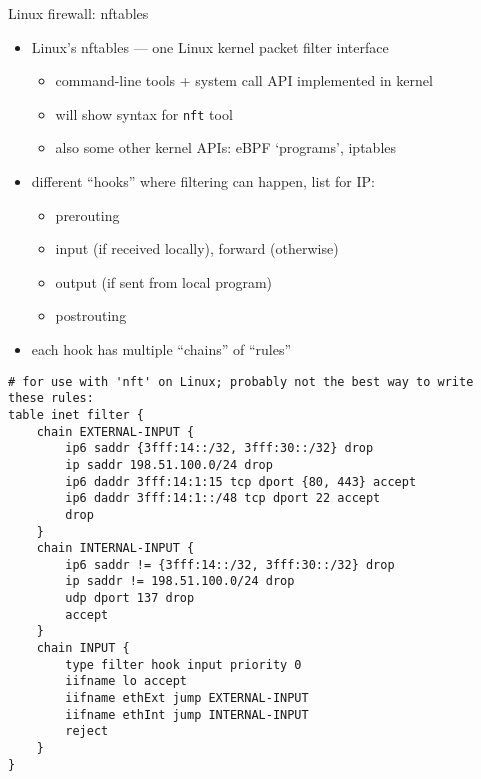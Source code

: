 \begin{frame}[fragile]{Linux firewall: nftables}
\begin{itemize}
\item Linux's nftables --- one Linux kernel packet filter interface
    \begin{itemize}
    \item command-line tools + system call API implemented in kernel
    \item will show syntax for \texttt{nft} tool
    \item also some other kernel APIs: eBPF `programs', iptables
    \end{itemize}
\item different ``hooks'' where filtering can happen, list for IP:
    \begin{itemize}
    \item prerouting
    \item input (if received locally), forward (otherwise)
    \item output (if sent from local program)
    \item postrouting
    \end{itemize}
\item each hook has multiple ``chains'' of ``rules''
\end{itemize}
\end{frame}

\begin{frame}[fragile]{}
\begin{Verbatim}[fontsize=\fontsize{9}{10}\selectfont]
# for use with 'nft' on Linux; probably not the best way to write these rules:
table inet filter {
    chain EXTERNAL-INPUT {
        ip6 saddr {3fff:14::/32, 3fff:30::/32} drop
        ip saddr 198.51.100.0/24 drop
        ip6 daddr 3fff:14:1:15 tcp dport {80, 443} accept
        ip6 daddr 3fff:14:1::/48 tcp dport 22 accept
        drop
    }
    chain INTERNAL-INPUT {
        ip6 saddr != {3fff:14::/32, 3fff:30::/32} drop
        ip saddr != 198.51.100.0/24 drop
        udp dport 137 drop
        accept
    }
    chain INPUT {
        type filter hook input priority 0
        iifname lo accept
        iifname ethExt jump EXTERNAL-INPUT
        iifname ethInt jump INTERNAL-INPUT
        reject
    }
}
\end{Verbatim}
\end{frame}


